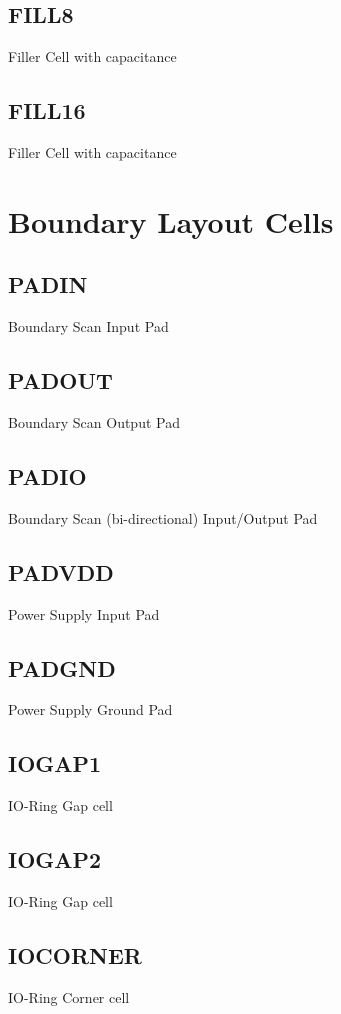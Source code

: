 \documentclass[12pt, a4paper, twoside, titlepage]{article}
\begin{document}
\subsection{FILL8}
Filler Cell with capacitance

\subsection{FILL16}
Filler Cell with capacitance


\section{Boundary Layout Cells}

\subsection{PADIN}
Boundary Scan Input Pad

\subsection{PADOUT}
Boundary Scan Output Pad

\subsection{PADIO}
Boundary Scan (bi-directional) Input/Output Pad

\subsection{PADVDD}
Power Supply Input Pad

\subsection{PADGND}
Power Supply Ground Pad

\subsection{IOGAP1}
IO-Ring Gap cell

\subsection{IOGAP2}
IO-Ring Gap cell

\subsection{IOCORNER}
IO-Ring Corner cell
\end{document}
